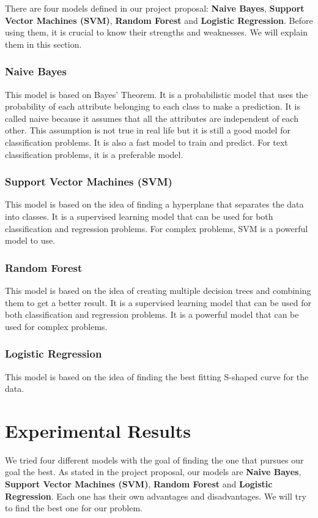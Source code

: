 \documentclass[conference]{IEEEtran}
\begin{document}
There are four models defined in our project proposal: \textbf{Naive Bayes}, \textbf{Support Vector Machines (SVM)}, \textbf{Random Forest} and \textbf{Logistic Regression}. Before using them, it is crucial to know their strengths and weaknesses. We will explain them in this section.

\subsubsection{Naive Bayes}
This model is based on Bayes' Theorem. It is a probabilistic model that uses the probability of each attribute belonging to each class to make a prediction. It is called naive because it assumes that all the attributes are independent of each other. This assumption is not true in real life but it is still a good model for classification problems. It is also a fast model to train and predict. For text classification problems, it is a preferable model.

\subsubsection{Support Vector Machines (SVM)}
This model is based on the idea of finding a hyperplane that separates the data into classes. It is a supervised learning model that can be used for both classification and regression problems. For complex problems, SVM is a powerful model to use.

\subsubsection{Random Forest}
This model is based on the idea of creating multiple decision trees and combining them to get a better result. It is a supervised learning model that can be used for both classification and regression problems. It is a powerful model that can be used for complex problems.

\subsubsection{Logistic Regression}
This model is based on the idea of finding the best fitting S-shaped curve for the data.

\section{Experimental Results}

We tried four different models with the goal of finding the one that pursues our goal the best. As stated in the project proposal, our models are \textbf{Naive Bayes}, \textbf{Support Vector Machines (SVM)}, \textbf{Random Forest} and \textbf{Logistic Regression}. Each one has their own advantages and disadvantages. We will try to find the best one for our problem.
\end{document}
